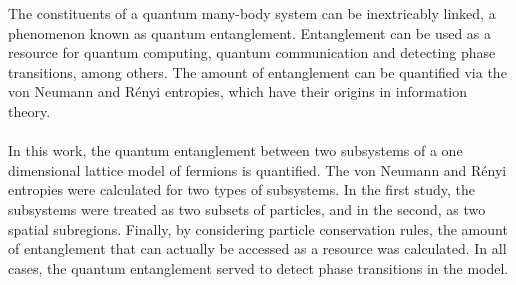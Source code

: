 The constituents of a quantum many-body system can be inextricably linked, a phenomenon known as quantum entanglement. Entanglement can be used as a resource for quantum computing, quantum communication and detecting phase transitions, among others. The amount of entanglement can be quantified via the von Neumann and R\'enyi entropies, which have their origins in information theory.
\\
\\
In this work, the quantum entanglement between two subsystems of a one dimensional lattice model of fermions is quantified. The von Neumann and R\'enyi entropies were calculated for two types of subsystems. In the first study, the subsystems were treated as two subsets of particles, and in the second, as two spatial subregions. Finally, by considering particle conservation rules, the amount of entanglement that can actually be accessed as a resource was calculated. In all cases, the quantum entanglement served to detect phase transitions in the model. 